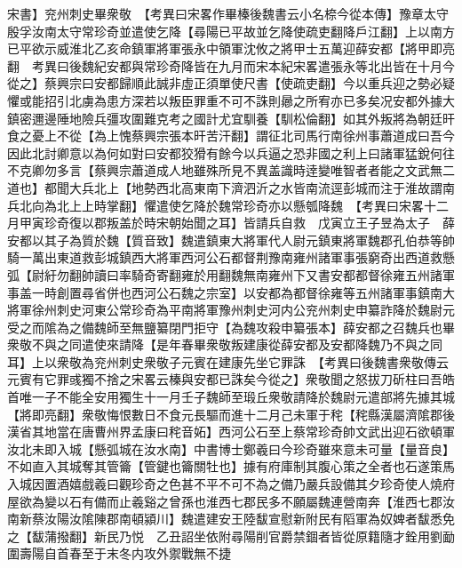 宋書】兖州刺史畢衆敬　【考異曰宋畧作畢榛後魏書云小名㮈今從本傳】豫章太守殷孚汝南太守常珍奇並遣使乞降【尋陽已平故並乞降使疏吏翻降戶江翻】上以南方已平欲示威淮北乙亥命鎮軍將軍張永中領軍沈攸之將甲士五萬迎薛安都【將甲即亮翻　考異曰後魏紀安都與常珍奇降皆在九月而宋本紀宋畧遣張永等北出皆在十月今從之】蔡興宗曰安都歸順此誠非虛正須單使尺書【使疏吏翻】今以重兵迎之勢必疑懼或能招引北虜為患方深若以叛臣罪重不可不誅則曏之所宥亦已多矣况安都外據大鎮密邇邊陲地險兵彊攻圍難克考之國計尤宜馴養【馴松倫翻】如其外叛將為朝廷旰食之憂上不從【為上愧蔡興宗張本旰苦汗翻】謂征北司馬行南徐州事蕭道成曰吾今因此北討卿意以為何如對曰安都狡猾有餘今以兵逼之恐非國之利上曰諸軍猛銳何往不克卿勿多言【蔡興宗蕭道成人地雖殊所見不異盖識時逹變唯智者者能之文武無二道也】都聞大兵北上【地勢西北高東南下濟泗沂之水皆南流逕彭城而注于淮故謂南兵北向為北上上時掌翻】懼遣使乞降於魏常珍奇亦以懸瓠降魏　【考異曰宋畧十二月甲寅珍奇復以郡叛盖於時宋朝始聞之耳】皆請兵自救　戊寅立王子昱為太子　薛安都以其子為質於魏【質音致】魏遣鎮東大將軍代人尉元鎮東將軍魏郡孔伯恭等帥騎一萬出東道救彭城鎮西大將軍西河公石都督荆豫南雍州諸軍事張窮奇出西道救懸弧【尉紆勿翻帥讀曰率騎奇寄翻雍於用翻魏無南雍州下又書安都都督徐雍五州諸軍事盖一時創置尋省併也西河公石魏之宗室】以安都為都督徐雍等五州諸軍事鎮南大將軍徐州刺史河東公常珍奇為平南將軍豫州刺史河内公兖州刺史申纂詐降於魏尉元受之而隂為之備魏師至無鹽纂閉門拒守【為魏攻殺申纂張本】薛安都之召魏兵也畢衆敬不與之同遣使來請降【是年春畢衆敬叛建康從薛安都及安都降魏乃不與之同耳】上以衆敬為兖州刺史衆敬子元賓在建康先坐它罪誅　【考異曰後魏書衆敬傳云元賓有它罪彧獨不捨之宋畧云榛與安都已誅矣今從之】衆敬聞之怒拔刀斫柱曰吾皓首唯一子不能全安用獨生十一月壬子魏師至瑖丘衆敬請降於魏尉元遣部將先據其城【將即亮翻】衆敬悔恨數日不食元長驅而進十二月己未軍于秺【秺縣漢屬濟隂郡後漢省其地當在唐曹州界孟康曰秺音妬】西河公石至上蔡常珍奇帥文武出迎石欲頓軍汝北未即入城【懸弧城在汝水南】中書博士鄭羲曰今珍奇雖來意未可量【量音良】不如直入其城奪其管籥【管鍵也籥關牡也】據有府庫制其腹心策之全者也石遂策馬入城因置酒嬉戲羲曰觀珍奇之色甚不平不可不為之備乃嚴兵設備其夕珍奇使人燒府屋欲為變以石有備而止羲谿之曾孫也淮西七郡民多不願屬魏連營南奔【淮西七郡汝南新蔡汝陽汝隂陳郡南頓潁川】魏遣建安王陸馛宣慰新附民有䧟軍為奴婢者馛悉免之【馛蒲撥翻】新民乃悦　乙丑詔坐依附尋陽削官爵禁錮者皆從原籍隨才銓用劉勔圍壽陽自首春至于末冬内攻外禦戰無不捷

